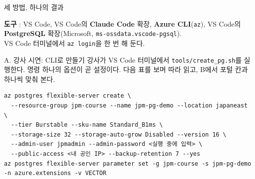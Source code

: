 \begin{frame}{세 방법, 하나의 결과}
\centering
{}
\vspace{0.6em}

\raggedright\small
\textbf{도구} : VS Code, VS Code의 \textbf{Claude Code} 확장, \textbf{Azure CLI}(\texttt{az}),
VS Code의 \textbf{PostgreSQL} 확장(Microsoft, \texttt{ms-ossdata.vscode-pgsql}).\\
VS Code 터미널에서 \texttt{az login}을 한 번 해 둔다.
\end{frame}

\begin{frame}[fragile]{A. 강사 시연: CLI로 만들기}
강사가 VS Code 터미널에서 \texttt{tools/create\_pg.sh}를 실행한다.
\alert{명령 하나의 옵션이 곧 설정}이다. 다음 표를 보며 따라 읽고, B에서 포털 칸과 하나씩 맞춰 본다.
\vspace{0.4em}
\begin{Verbatim}
az postgres flexible-server create \
  --resource-group jpm-course --name jpm-pg-demo --location japaneast \
  --tier Burstable --sku-name Standard_B1ms \
  --storage-size 32 --storage-auto-grow Disabled --version 16 \
  --admin-user jpmadmin --admin-password <실행 중에 입력> \
  --public-access <내 공인 IP> --backup-retention 7 --yes
az postgres flexible-server parameter set -g jpm-course -s jpm-pg-demo -n azure.extensions -v VECTOR
\end{Verbatim}
\end{frame}

